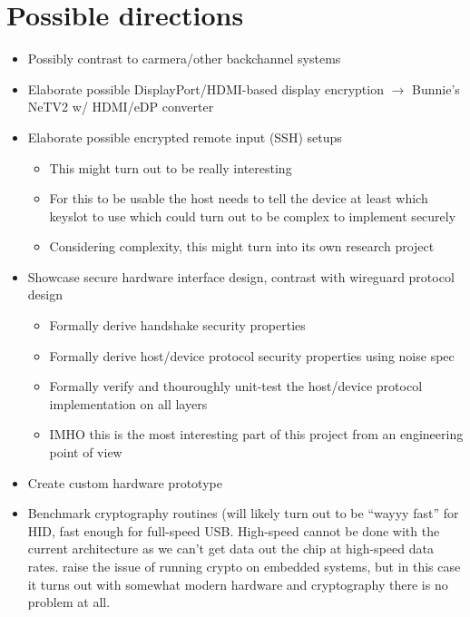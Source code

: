 \documentclass[12pt,a4paper,notitlepage]{article}
\begin{document}
\section{Possible directions}
\begin{itemize}
            \item Possibly contrast to carmera/other backchannel systems
    \item Elaborate possible DisplayPort/HDMI-based display encryption $\rightarrow$ Bunnie's NeTV2 w/ HDMI/eDP converter
    \item Elaborate possible encrypted remote input (SSH) setups
        \begin{itemize}
            \item This might turn out to be really interesting
            \item For this to be usable the host needs to tell the device at least which keyslot to use which could turn
                out to be complex to implement securely
            \item Considering complexity, this might turn into its own research project
        \end{itemize}
    \item Showcase secure hardware interface design, contrast with wireguard protocol design
        \begin{itemize}
            \item Formally derive handshake security properties
            \item Formally derive host/device protocol security properties using noise spec
            \item Formally verify and thouroughly unit-test the host/device protocol implementation on all layers
            \item IMHO this is the most interesting part of this project from an engineering point of view
        \end{itemize}
    \item Create custom hardware prototype
    \item Benchmark cryptography routines (will likely turn out to be ``wayyy fast'' for HID, fast enough for full-speed
        USB. High-speed cannot be done with the current architecture as we can't get data out the chip at high-speed
        data rates. \textcite{srivaths01} raise the issue of running crypto on embedded systems, but in this case it
        turns out with somewhat modern hardware and cryptography there is no problem at all.
\end{itemize}
\end{document}
